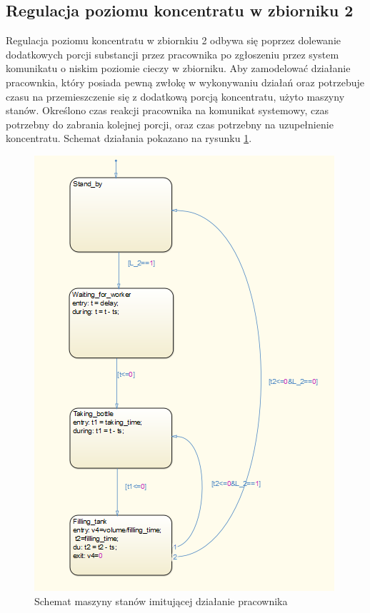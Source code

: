 \subsection{Regulacja poziomu koncentratu w zbiorniku 2}
\indent Regulacja poziomu koncentratu w zbiornkiu 2 odbywa się poprzez dolewanie dodatkowych porcji substancji przez pracownika po zgłoszeniu przez system komunikatu o niskim poziomie cieczy w zbiorniku. Aby zamodelować działanie pracownkia, który posiada pewną zwłokę w wykonywaniu działań oraz potrzebuje czasu na przemieszczenie się z dodatkową porcją koncentratu, użyto maszyny stanów. Określono czas reakcji pracownika na komunikat systemowy, czas potrzebny do zabrania kolejnej porcji, oraz czas potrzebny na uzupełnienie koncentratu. Schemat działania pokazano na rysunku \ref{fig:Worker_state}.
\begin{figure}[H]
	\centering
	\includegraphics[scale = 0.8]{fig/worker_state.png}
	\caption{Schemat maszyny stanów imitującej działanie pracownika}
	\label{fig:Worker_state}
\end{figure}
